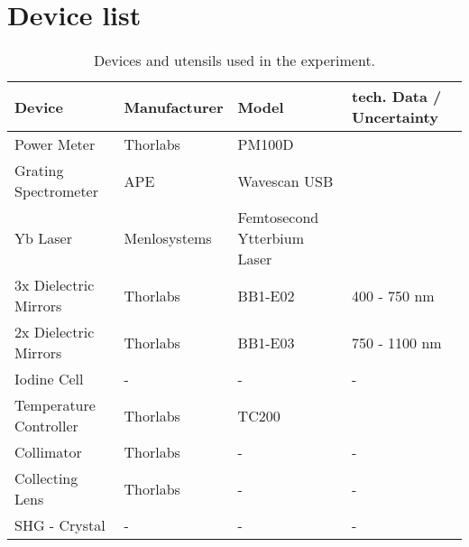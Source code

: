 \section{Device list}
\label{sec:geraeteliste}
\begin{table}[H]
	\centering
	\caption{
		Devices and utensils used in the experiment.
		}
	\begin{tabular}[h]{| l | l | l | l |}
		\hline
		Device     & Manufacturer   & Model  & tech. Data / Uncertainty       \\\hline
		\hline
		Power Meter & Thorlabs & PM100D & \cite{Power} \\ \hline
		Grating Spectrometer & APE & Wavescan USB &  \cite{Speck} \\ \hline
		Yb Laser & Menlosystems & Femtosecond Ytterbium Laser & \cite{Laser} \\ \hline
		3x Dielectric Mirrors & Thorlabs & BB1-E02 & 400 - 750 nm \\ \hline
		2x Dielectric Mirrors & Thorlabs & BB1-E03 & 750 - 1100 nm \\ \hline
		Iodine Cell & - & - & - \\ \hline
 		Temperature Controller & Thorlabs & TC200 & \cite{TempC} \\ \hline
		Collimator &Thorlabs & - &- \\ \hline 
		Collecting Lens & Thorlabs & -& - \\ \hline
		SHG - Crystal & - & - & - \\ \hline
	\end{tabular}
	\label{tab:Geraeteliste}
\end{table}
\newpage